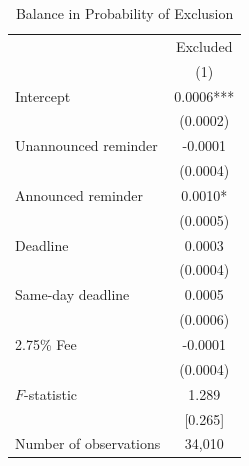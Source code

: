 \begin{table}[H]
\caption{Balance in Probability of Exclusion} 
\label{tab:table_attrition}
\centering
\begin{tabular}[t]{lc}
\toprule
  & Excluded\\
& (1)\\
\midrule
Intercept & 0.0006***\\
 & (0.0002)\\
Unannounced reminder & -0.0001\\
 &  (0.0004)\\
Announced reminder & 0.0010*\\
 & (0.0005)\\
Deadline & 0.0003\\
 &  (0.0004)\\
Same-day deadline & 0.0005\\
 & (0.0006)\\
2.75\% Fee & -0.0001\\
 & (0.0004)\\
\midrule
$F$-statistic & 1.289\\
& [0.265]\\
Number of observations & 34,010\\
\bottomrule
\end{tabular}
\end{table}
